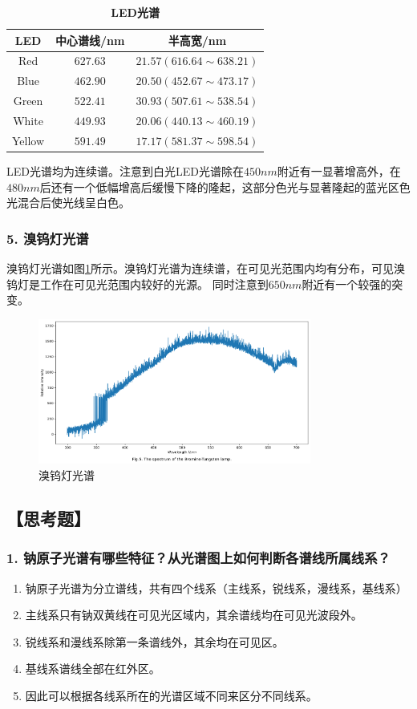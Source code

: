 \documentclass[12pt,a4paper,UTF8]{ctexart}
\begin{document}
\begin{table}[htbp]
	\centering
	\begin{tabular}{ccc}
	\toprule
	LED &中心谱线/nm &半高宽/nm \\
	\midrule
	Red &$627.63$ &$21.57(616.64\sim 638.21)$ \\
	Blue &$462.90$ &$20.50(452.67\sim 473.17)$ \\
	Green &$522.41$ &$30.93(507.61\sim 538.54)$ \\
	White &$449.93$ &$20.06(440.13\sim 460.19)$ \\
	Yellow &$591.49$ &$17.17(581.37\sim 598.54)$ \\
	\bottomrule
    \end{tabular}
    \caption{\textbf{LED光谱}}
	\label{tab:4}
\end{table}

LED光谱均为连续谱。注意到白光LED光谱除在$450nm$附近有一显著增高外，在$480nm$后还有一个低幅增高后缓慢下降的隆起，这部分色光与显著隆起的蓝光区色光混合后使光线呈白色。

\subsubsection*{5. 溴钨灯光谱}
溴钨灯光谱如图\ref{fig:5}所示。溴钨灯光谱为连续谱，在可见光范围内均有分布，可见溴钨灯是工作在可见光范围内较好的光源。
同时注意到$650nm$附近有一个较强的突变。

\begin{figure}[htbp]
	\centering
	\includegraphics[width=0.8\textwidth]{attachments//Fig.5.png}
	\caption{溴钨灯光谱}
	\label{fig:5}
\end{figure}

\subsection*{【思考题】}
\subsubsection*{1. 钠原子光谱有哪些特征？从光谱图上如何判断各谱线所属线系？}
\begin{enumerate}[label=\arabic*.]
	\item 钠原子光谱为分立谱线，共有四个线系（主线系，锐线系，漫线系，基线系）
	\item 主线系只有钠双黄线在可见光区域内，其余谱线均在可见光波段外。
	\item 锐线系和漫线系除第一条谱线外，其余均在可见区。
	\item 基线系谱线全部在红外区。
	\item 因此可以根据各线系所在的光谱区域不同来区分不同线系。
\end{enumerate}
\end{document}
